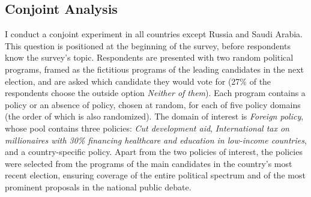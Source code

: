 \documentclass[12pt,english]{article}
\begin{document}
\subsection{Conjoint Analysis}\label{subsec:conjoint}

I conduct a conjoint experiment in all countries except Russia and Saudi Arabia. This question is positioned at the beginning of the survey, before respondents know the survey's topic. Respondents are presented with two random political programs, framed as the fictitious programs of the leading candidates in the next election, and are asked which candidate they would vote for (27\% of the respondents choose the outside option \textit{Neither of them}). Each program contains a policy or an absence of policy, chosen at random, for each of five policy domains (the order of which is also randomized). %
The domain of interest is \textit{Foreign policy}, whose pool contains three policies: \textit{Cut development aid}, \textit{International tax on millionaires with 30\% financing healthcare and education in low-income countries}, and a country-specific policy. %
Apart from the two policies of interest, the policies were selected from the programs of the main candidates in the country's most recent election, ensuring coverage of the entire political spectrum and of the most prominent proposals in the national public debate. 
\end{document}
